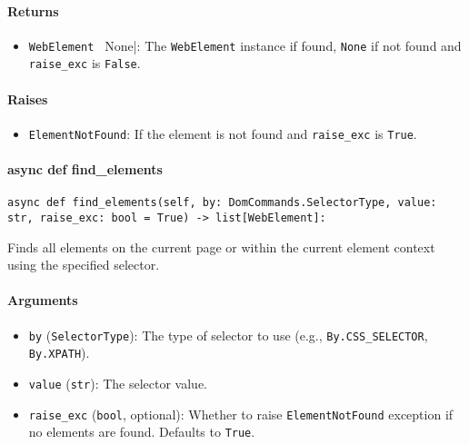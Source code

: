 \documentclass{article}
\begin{document}
\paragraph{Returns}

\begin{itemize}
    \item \lstinline[style=pythonstyle]|WebElement | None|: The \lstinline[style=pythonstyle]|WebElement| instance if found, \lstinline[style=pythonstyle]|None| if not found and \lstinline[style=pythonstyle]|raise_exc| is \lstinline[style=pythonstyle]|False|.
\end{itemize}

\paragraph{Raises}

\begin{itemize}
    \item \lstinline[style=pythonstyle]|ElementNotFound|: If the element is not found and \lstinline[style=pythonstyle]|raise_exc| is \lstinline[style=pythonstyle]|True|.
\end{itemize}

\paragraph{async def find\_elements}

\begin{lstlisting}[style=pythonstyle]
async def find_elements(self, by: DomCommands.SelectorType, value: str, raise_exc: bool = True) -> list[WebElement]:
\end{lstlisting}

\noindent Finds all elements on the current page or within the current element context using the specified selector.

\paragraph{Arguments}

\begin{itemize}
    \item \lstinline[style=pythonstyle]|by| (\lstinline[style=pythonstyle]|SelectorType|): The type of selector to use (e.g., \lstinline[style=pythonstyle]|By.CSS_SELECTOR|, \lstinline[style=pythonstyle]|By.XPATH|).
    \item \lstinline[style=pythonstyle]|value| (\lstinline[style=pythonstyle]|str|): The selector value.
    \item \lstinline[style=pythonstyle]|raise_exc| (\lstinline[style=pythonstyle]|bool|, optional): Whether to raise \lstinline[style=pythonstyle]|ElementNotFound| exception if no elements are found. Defaults to \lstinline[style=pythonstyle]|True|.
\end{itemize}
\end{document}
